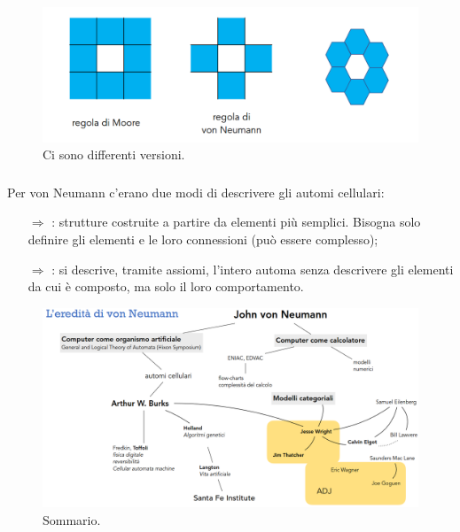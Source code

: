 \begin{figure}[h]
    \centering
    \includegraphics[scale = 0.45]{images/Automi cellulari.png}
    \caption{Ci sono differenti versioni.}
\end{figure}

\subsubsection{}

Per von Neumann c'erano due modi di descrivere gli automi cellulari:

\begin{itemize}
    \item [$\Rightarrow$] : strutture
    costruite a partire da elementi più semplici. Bisogna solo definire gli elementi e le loro connessioni (può essere complesso);
    \item [$\Rightarrow$] : si descrive, tramite assiomi, l'intero automa senza descrivere
    gli elementi da cui è composto, ma solo il loro comportamento.
\end{itemize}

\begin{figure}
    \centering
    \includegraphics[scale = 0.3]{images/V1.png}
    \caption{Sommario.}
\end{figure}

